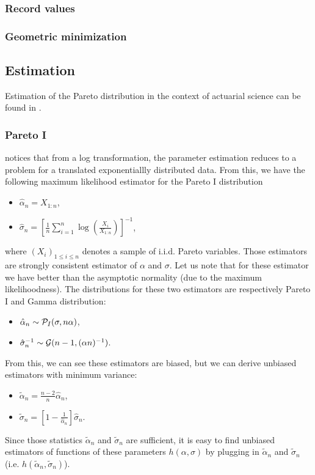 \subsubsection{Record values}

\subsubsection{Geometric minimization}

\subsection{Estimation}
Estimation of the Pareto distribution in the context of actuarial science can be found in \cite{rytgaard}.

\subsubsection{Pareto I}
\cite{arnold83} notices that from a log transformation, the parameter estimation reduces to a problem for a translated exponentiallly distributed data. From this, we have the following maximum likelihood estimator for the Pareto I distribution
\begin{itemize}
\item $\hat \alpha_n = X_{1:n}$,
\item $\hat \sigma_n = \left[ \frac{1}{n} \sum_{i=1}^n \log\left(\frac{X_i}{X_{1:n}}\right) \right]^{-1}$,
\end{itemize}
where $(X_i)_{1\leq i\leq n}$ denotes a sample of i.i.d. Pareto variables. Those estimators are strongly consistent estimator of $\alpha$ and $\sigma$. Let us note that for these estimator we have better than the asymptotic normality (due to the maximum likelihoodness). The distributions for these two estimators are
respectively Pareto I and Gamma distribution:
\begin{itemize}
\item $\hat \alpha_n \sim \mathcal P_I(\sigma, n\alpha)$,
\item $\hat \sigma_n^{-1} \sim \mathcal G(n-1, (\alpha n)^{-1})$.
\end{itemize}
From this, we can see these estimators are biased, but we can derive unbiased estimators with minimum variance: 
\begin{itemize}
\item $\tilde \alpha_n = \frac{n-2}{n}\hat \alpha_n$,
\item $\tilde \sigma_n = \left[ 1 - \frac{1}{\hat \alpha_n} \right] \hat \sigma_n$.
\end{itemize}
Since those statistics $\tilde \alpha_n$ and $\tilde \sigma_n$ are sufficient, it is easy to find unbiased estimators of functions of these parameters $h(\alpha,\sigma)$ by plugging in $\tilde \alpha_n$ and $\tilde \sigma_n$ (i.e. $h(\tilde \alpha_n,\tilde \sigma_n)$).


